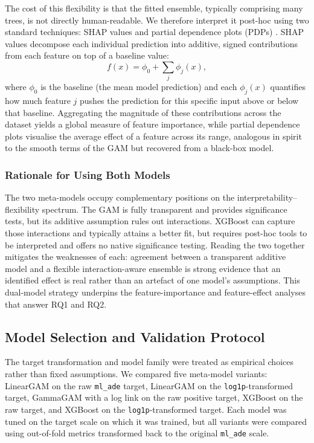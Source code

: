 \documentclass[12pt]{article}
\begin{document}
The cost of this flexibility is that the fitted ensemble, typically comprising many trees, is not directly human-readable. We therefore interpret it post-hoc using two standard techniques: SHAP values \citep{lundberg2017shap} and partial dependence plots (PDPs) \citep{friedman2001gbm}. SHAP values decompose each individual prediction into additive, signed contributions from each feature on top of a baseline value:
\begin{equation}
  f(x) = \phi_0 + \sum_{j} \phi_j(x),
  \label{eq:shap}
\end{equation}
where $\phi_0$ is the baseline (the mean model prediction) and each $\phi_j(x)$ quantifies how much feature $j$ pushes the prediction for this specific input above or below that baseline. Aggregating the magnitude of these contributions across the dataset yields a global measure of feature importance, while partial dependence plots visualise the average effect of a feature across its range, analogous in spirit to the smooth terms of the GAM but recovered from a black-box model.

\subsubsection{Rationale for Using Both Models}

The two meta-models occupy complementary positions on the interpretability–flexibility spectrum. The GAM is fully transparent and provides significance tests, but its additive assumption rules out interactions. XGBoost can capture those interactions and typically attains a better fit, but requires post-hoc tools to be interpreted and offers no native significance testing. Reading the two together mitigates the weaknesses of each: agreement between a transparent additive model and a flexible interaction-aware ensemble is strong evidence that an identified effect is real rather than an artefact of one model's assumptions. This dual-model strategy underpins the feature-importance and feature-effect analyses that answer RQ1 and RQ2.

\subsection{Model Selection and Validation Protocol}
\label{sec:model_selection_validation}

The target transformation and model family were treated as empirical choices rather than fixed assumptions. We compared five meta-model variants: LinearGAM on the raw \texttt{ml\_ade} target, LinearGAM on the \texttt{log1p}-transformed target, GammaGAM with a log link on the raw positive target, XGBoost on the raw target, and XGBoost on the \texttt{log1p}-transformed target. Each model was tuned on the target scale on which it was trained, but all variants were compared using out-of-fold metrics transformed back to the original \texttt{ml\_ade} scale.
\end{document}
